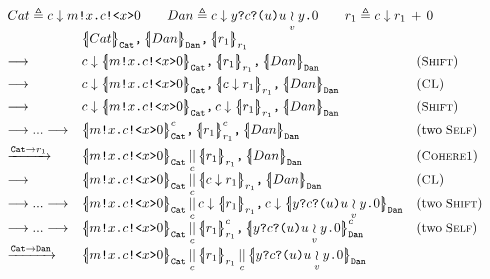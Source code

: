 \begin{figure}[t]
{\footnotesize
\[
\begin{array}{l}
\begin{array}{l}
Cat\triangleq\down{c}{\send{m}{x}{\csend{c}{x}{0}}}
\qquad
Dan\triangleq\down{c}{\rev{y}{\crev{c}{u}{\mer{u}{v}{y}{0}}}}
\qquad
r_1\triangleq \parp{\down{c}r_1}{0}
\end{array}\\
\begin{array}{lll}
&
\pard{\pard{\qcellb{Cat}{\cn{Cat}}}
{\qcellb{Dan}{\cn{Dan}}}}
{\qcellb{r_1}{r_1}}
&
\\[0.5em]
\longrightarrow
&
\pard{\pard{\down{c}\qcellb{\send{m}{x}{\csend{c}{x}{0}}}{\cn{Cat}}}
{\qcellb{r_1}{r_1}}}
{\qcellb{Dan}{\cn{Dan}}}
&
(\rulelab{Shift})
\\[0.5em]
\longrightarrow
&
\pard{\pard{\down{c}\qcellb{\send{m}{x}{\csend{c}{x}{0}}}{\cn{Cat}}}
{\qcellb{\down{c}r_1}{r_1}}}
{\qcellb{Dan}{\cn{Dan}}}
&
(\rulelab{CL})
\\[0.5em]
\longrightarrow
&
\pard{\pard{\down{c}\qcellb{\send{m}{x}{\csend{c}{x}{0}}}{\cn{Cat}}}
{\down{c}\qcellb{r_1}{r_1}}}
{\qcellb{Dan}{\cn{Dan}}}
&
(\rulelab{Shift})
\\[0.5em]
\longrightarrow...\longrightarrow
&
\pard{\pard{\pcellb{\send{m}{x}{\csend{c}{x}{0}}}{c}{\cn{Cat}}}
{\pcellb{r_1}{c}{r_1}}}
{\qcellb{Dan}{\cn{Dan}}}
&
(\text{two}\;\rulelab{Self})
\\[0.5em]
\xrightarrow{\cn{Cat}\to r_1}
&
\pard{\parll{\qcellb{\send{m}{x}{\csend{c}{x}{0}}}{\cn{Cat}}}{c}
{\qcellb{r_1}{r_1}}}
{\qcellb{Dan}{\cn{Dan}}}
&
(\rulelab{Cohere1})
\\[0.5em]
\longrightarrow
&
\pard{\parll{\qcellb{\send{m}{x}{\csend{c}{x}{0}}}{\cn{Cat}}}{c}
{\qcellb{\down{c}r_1}{r_1}}}
{\qcellb{Dan}{\cn{Dan}}}
&
(\rulelab{CL})
\\[0.5em]
\longrightarrow...\longrightarrow
&
\pard{\parll{\qcellb{\send{m}{x}{\csend{c}{x}{0}}}{\cn{Cat}}}{c}
{\down{c}\qcellb{r_1}{r_1}}}
{\down{c}\qcellb{\rev{y}{\crev{c}{u}{\mer{u}{v}{y}{0}}}}{\cn{Dan}}}
&
(\text{two}\;\rulelab{Shift})
\\[0.5em]
\longrightarrow...\longrightarrow
&
\pard{\parll{\qcellb{\send{m}{x}{\csend{c}{x}{0}}}{\cn{Cat}}}{c}
{\pcellb{r_1}{c}{r_1}}}
{\pcellb{\rev{y}{\crev{c}{u}{\mer{u}{v}{y}{0}}}}{c}{\cn{Dan}}}
&
(\text{two}\;\rulelab{Self})
\\[0.5em]
\xrightarrow{\cn{Cat}\to \cn{Dan}}
&
\parll{\parll{\qcellb{\send{m}{x}{\csend{c}{x}{0}}}{\cn{Cat}}}{c}
{\qcellb{r_1}{r_1}}}{c}
{\qcellb{\rev{y}{\crev{c}{u}{\mer{u}{v}{y}{0}}}}{\cn{Dan}}}

\end{array}
\end{array}\]}
\end{figure}
